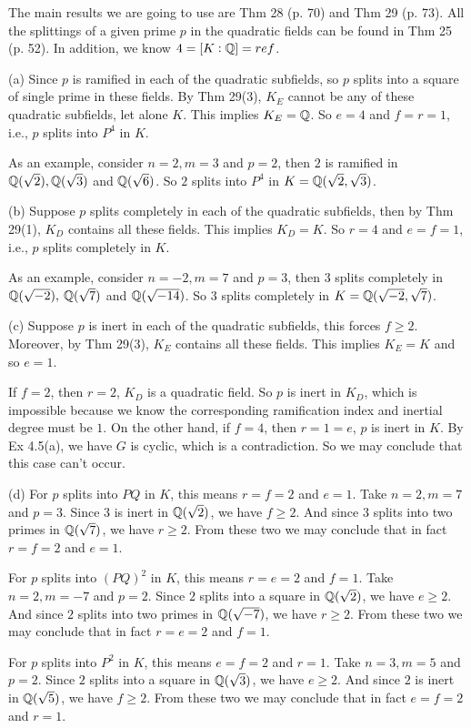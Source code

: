 \documentclass[../Marcus.tex]{subfiles}
\begin{document}
The main results we are going to use are Thm 28 (p. 70) and Thm 29 (p. 73). All the splittings of a given prime $p$ in the quadratic fields can be found in Thm 25 (p. 52). In addition, we know $4=[K:\mathbb{Q}]=ref$.

(a) Since $p$ is ramified in each of the quadratic subfields, so $p$ splits into a square of single prime in these fields. By Thm 29(3), $K_E$ cannot be any of these quadratic subfields, let alone $K$. This implies $K_E=\mathbb{Q}$. So $e=4$ and $f=r=1$, i.e., $p$ splits into $P^4$ in $K$.

As an example, consider $n=2,m=3$ and $p=2$, then $2$ is ramified in $\mathbb{Q}(\sqrt{2}),\mathbb{Q}(\sqrt{3})$ and $\mathbb{Q}(\sqrt{6})$. So $2$ splits into $P^4$ in $K=\mathbb{Q}(\sqrt{2},\sqrt{3})$.

(b) Suppose $p$ splits completely in each of the quadratic subfields, then by Thm 29(1), $K_D$ contains all these fields. This implies $K_D=K$. So $r=4$ and $e=f=1$, i.e., $p$ splits completely in $K$.

As an example, consider $n=-2,m=7$ and $p=3$, then $3$ splits completely in $\mathbb{Q}(\sqrt{-2}),$ $\mathbb{Q}(\sqrt{7})$ and $\mathbb{Q}(\sqrt{-14})$. So $3$ splits completely in $K=\mathbb{Q}(\sqrt{-2},\sqrt{7})$.

(c) Suppose $p$ is inert in each of the quadratic subfields, this forces $f\geq 2$. Moreover, by Thm 29(3), $K_E$ contains all these fields. This implies $K_E=K$ and so $e=1$.

If $f=2$, then $r=2$, $K_D$ is a quadratic field. So $p$ is inert in $K_D$, which is impossible because we know the corresponding ramification index and inertial degree must be $1$. On the other hand, if $f=4$, then $r=1=e$, $p$ is inert in $K$. By Ex 4.5(a), we have $G$ is cyclic, which is a contradiction. So we may conclude that this case can't occur.

(d) For $p$ splits into $PQ$ in $K$, this means $r=f=2$ and $e=1$. Take $n=2,m=7$ and $p=3$. Since $3$ is inert in $\mathbb{Q}(\sqrt{2})$, we have $f\geq 2$. And since $3$ splits into two primes in $\mathbb{Q}(\sqrt{7})$, we have $r\geq 2$. From these two we may conclude that in fact $r=f=2$ and $e=1$.

For $p$ splits into $(PQ)^2$ in $K$, this means $r=e=2$ and $f=1$. Take $n=2,m=-7$ and $p=2$. Since $2$ splits into a square in $\mathbb{Q}(\sqrt{2})$, we have $e\geq 2$. And since $2$ splits into two primes in $\mathbb{Q}(\sqrt{-7})$, we have $r\geq 2$. From these two we may conclude that in fact $r=e=2$ and $f=1$.

For $p$ splits into $P^2$ in $K$, this means $e=f=2$ and $r=1$. Take $n=3,m=5$ and $p=2$. Since $2$ splits into a square in $\mathbb{Q}(\sqrt{3})$, we have $e\geq 2$. And since $2$ is inert in $\mathbb{Q}(\sqrt{5})$, we have $f\geq 2$. From these two we may conclude that in fact $e=f=2$ and $r=1$.
\end{document}
